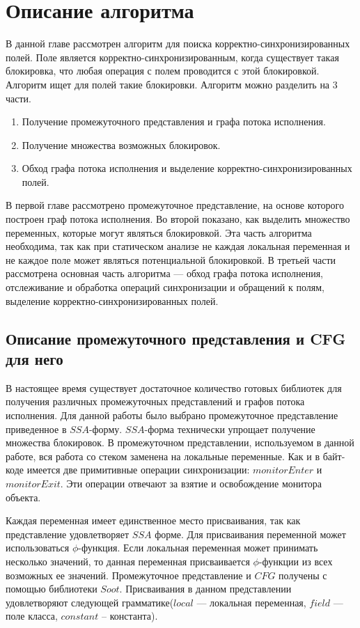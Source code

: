 \chapter{Описание алгоритма}

В данной главе рассмотрен алгоритм для поиска корректно-синхронизированных полей.
Поле является корректно-синхронизированным, когда существует такая блокировка, что любая операция с полем проводится с этой блокировкой. Алгоритм ищет для полей такие блокировки. 
Алгоритм можно разделить на 3 части. 
\begin{enumerate}
\item Получение промежуточного представления и графа потока исполнения.
\item Получение множества возможных блокировок.
\item Обход графа потока исполнения и выделение корректно-синхронизированных полей.
\end{enumerate}

В первой главе рассмотрено промежуточное представление, на основе которого построен граф потока исполнения. Во второй показано, как выделить множество переменных, которые могут являться блокировкой. Эта часть алгоритма необходима, так как при статическом анализе не каждая локальная переменная и не каждое поле может являться потенциальной блокировкой. 
В третьей части рассмотрена основная часть алгоритма --- обход графа потока исполнения, отслеживание и обработка операций синхронизации и обращений к полям, выделение корректно-синхронизированных полей.



\FloatBarrier
\section{Описание промежуточного представления и CFG для него}
В настоящее время существует достаточное количество готовых библиотек для получения различных промежуточных представлений и графов потока исполнения. 
Для данной работы было выбрано промежуточное представление приведенное в $SSA$-форму\cite{SSA}. $SSA$-форма технически упрощает получение множества блокировок. В промежуточном представлении, используемом в данной работе, вся работа со стеком заменена на локальные переменные. Как и в байт-коде имеется две примитивные операции синхронизации: $monitorEnter$ и $monitorExit$. Эти операции отвечают за взятие и освобождение монитора объекта.

Каждая переменная имеет единственное место присваивания, так как представление удовлетворяет $SSA$ форме. 
Для присваивания переменной может использоваться $\phi$-функция.
Если локальная переменная может принимать несколько значений, то данная переменная присваивается $\phi$-функции из всех возможных ее значений.
Промежуточное представление и $CFG$ получены с помощью библиотеки $Soot$\cite{Soot}. Присваивания в данном представлении удовлетворяют следующей грамматике($local$ --- локальная переменная, $field$ --- поле класса, $constant$ -- константа).

